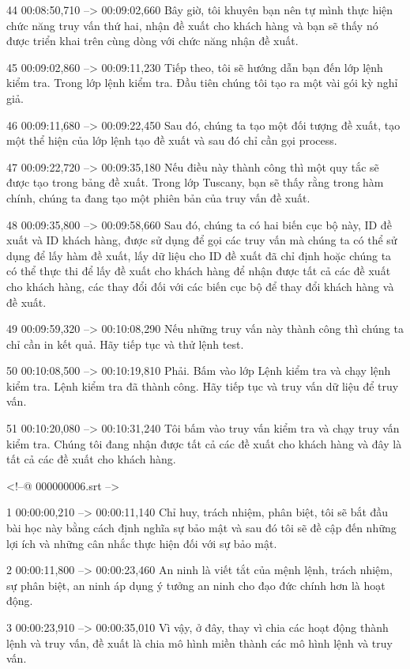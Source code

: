 44
00:08:50,710 --> 00:09:02,660
Bây giờ, tôi khuyên bạn nên tự mình thực hiện chức năng truy vấn thứ hai, nhận đề xuất cho khách hàng và bạn sẽ thấy nó được triển khai trên cùng dòng với chức năng nhận đề xuất.

45
00:09:02,860 --> 00:09:11,230
Tiếp theo, tôi sẽ hướng dẫn bạn đến lớp lệnh kiểm tra.  Trong lớp lệnh kiểm tra.  Đầu tiên chúng tôi tạo ra một vài gói kỳ nghỉ giả.

46
00:09:11,680 --> 00:09:22,450
Sau đó, chúng ta tạo một đối tượng đề xuất, tạo một thể hiện của lớp lệnh tạo đề xuất và sau đó chỉ cần gọi process.

47
00:09:22,720 --> 00:09:35,180
Nếu điều này thành công thì một quy tắc sẽ được tạo trong bảng đề xuất.  Trong lớp Tuscany, bạn sẽ thấy rằng trong hàm chính, chúng ta đang tạo một phiên bản của truy vấn đề xuất.

48
00:09:35,800 --> 00:09:58,660
Sau đó, chúng ta có hai biến cục bộ này, ID đề xuất và ID khách hàng, được sử dụng để gọi các truy vấn mà chúng ta có thể sử dụng để lấy hàm đề xuất, lấy dữ liệu cho ID đề xuất đã chỉ định hoặc chúng ta có thể thực thi để lấy đề xuất cho khách hàng để nhận được tất cả  các đề xuất cho khách hàng, các thay đổi đối với các biến cục bộ để thay đổi khách hàng và đề xuất.

49
00:09:59,320 --> 00:10:08,290
Nếu những truy vấn này thành công thì chúng ta chỉ cần in kết quả.  Hãy tiếp tục và thử lệnh test.

50
00:10:08,500 --> 00:10:19,810
Phải.  Bấm vào lớp Lệnh kiểm tra và chạy lệnh kiểm tra.  Lệnh kiểm tra đã thành công.  Hãy tiếp tục và truy vấn dữ liệu để truy vấn.

51
00:10:20,080 --> 00:10:31,240
Tôi bấm vào truy vấn kiểm tra và chạy truy vấn kiểm tra.  Chúng tôi đang nhận được tất cả các đề xuất cho khách hàng và đây là tất cả các đề xuất cho khách hàng.

<!--@ 000000006.srt -->

1
00:00:00,210 --> 00:00:11,140
Chỉ huy, trách nhiệm, phân biệt, tôi sẽ bắt đầu bài học này bằng cách định nghĩa sự bảo mật và sau đó tôi sẽ đề cập đến những lợi ích và những cân nhắc thực hiện đối với sự bảo mật.

2
00:00:11,800 --> 00:00:23,460
An ninh là viết tắt của mệnh lệnh, trách nhiệm, sự phân biệt, an ninh áp dụng ý tưởng an ninh cho đạo đức chính hơn là hoạt động.

3
00:00:23,910 --> 00:00:35,010
Vì vậy, ở đây, thay vì chia các hoạt động thành lệnh và truy vấn, đề xuất là chia mô hình miền thành các mô hình lệnh và truy vấn.

